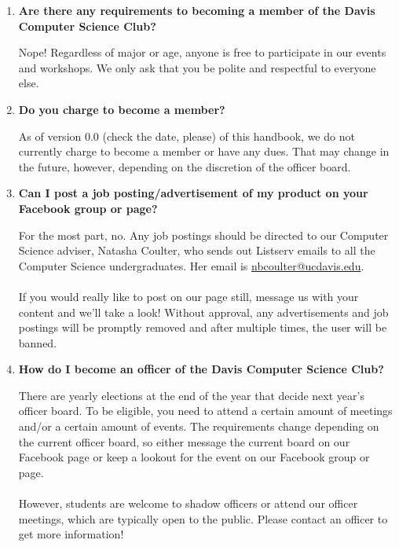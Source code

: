 \documentclass{article}
\begin{document}
\begin{enumerate}
    \item \textbf{Are there any requirements to becoming a member of the Davis Computer Science Club?}
    \begin{itemize}
        Nope! Regardless of major or age, anyone is free to participate in our events and workshops. We only ask that you be polite and respectful to everyone else. 
    \end{itemize}
    \item \textbf{Do you charge to become a member?}
    \begin{itemize}
        As of version 0.0 (check the date, please) of this handbook, we do not currently charge to become a member or have any dues. That may change in the future, however, depending on the discretion of the officer board.
    \end{itemize}
    \item \textbf{Can I post a job posting/advertisement of my product on your Facebook group or page?}
    \begin{itemize}
        For the most part, no. Any job postings should be directed to our Computer Science adviser, Natasha Coulter, who sends out Listserv emails to all the Computer Science undergraduates. Her email is \href{mailto:nbcoulter@ucdavis.edu}{nbcoulter@ucdavis.edu}.\\\\ 
        If you would really like to post on our page still, message us with your content and we'll take a look! Without approval, any advertisements and job postings will be promptly removed and after multiple times, the user will be banned. 
    \end{itemize}
    \item \textbf{How do I become an officer of the Davis Computer Science Club?}
    \begin{itemize}
        There are yearly elections at the end of the year that decide next year's officer board. To be eligible, you need to attend a certain amount of meetings and/or a certain amount of events. The requirements change depending on the current officer board, so either message the current board on our Facebook page or keep a lookout for the event on our Facebook group or page. \\ \\ However, students are welcome to shadow officers or attend our officer meetings, which are typically open to the public. Please contact an officer to get more information! 
    \end{itemize}

\end{enumerate}
\end{document}

